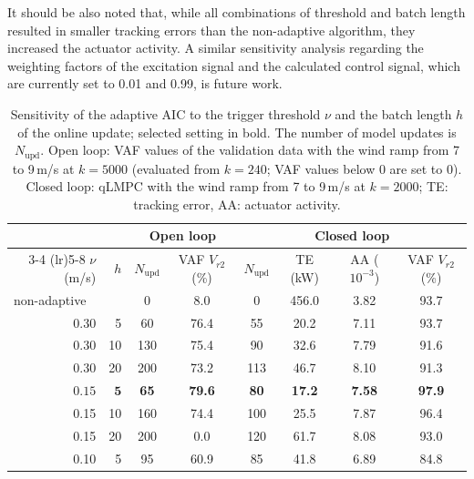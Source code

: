 It should be also noted that, while all combinations of threshold and batch length resulted in smaller tracking errors than the non-adaptive algorithm, they increased the actuator activity. A similar sensitivity analysis regarding the weighting factors of the excitation signal and the calculated control signal, which are currently set to 0.01 and 0.99, is future work.

\begin{table}[htbp]
    \centering
    \caption[Sensitivity of the adaptive AIC to the update settings]{Sensitivity of the adaptive AIC to the trigger threshold $\nu$ and the batch length $h$ of the online update; selected setting in bold. The number of model updates is $N_\text{upd}$. Open loop: VAF values of the validation data with the wind ramp from 7 to 9\,m/s at $k = 5000$ (evaluated from $k = 240$; VAF values below 0 are set to 0). Closed loop: qLMPC with the wind ramp from 7 to 9\,m/s at $k = 2000$; TE: tracking error, AA: actuator activity.}
    \label{tab:sensitivityAdaptiveAIC}
    \begin{tabular}{rr cc cccc}
        \toprule
        & & \multicolumn{2}{c}{Open loop} & \multicolumn{4}{c}{Closed loop} \\
        \cmidrule(lr){3-4} \cmidrule(lr){5-8}
        $\nu$ (m/s) & $h$ & $N_\text{upd}$ & VAF $V_{r2}$ (\%) & $N_\text{upd}$ & TE (kW) & AA ($10^{-3}$) & VAF $V_{r2}$ (\%) \\
        \midrule
        \multicolumn{2}{l}{non-adaptive} & 0 & 8.0 & 0 & 456.0 & 3.82 & 93.7 \\
        \midrule
        0.30 & 5 & 60 & 76.4 & 55 & 20.2 & 7.11 & 93.7 \\
        0.30 & 10 & 130 & 75.4 & 90 & 32.6 & 7.79 & 91.6 \\
        0.30 & 20 & 200 & 73.2 & 113 & 46.7 & 8.10 & 91.3 \\
        \midrule
        $\bm{0.15}$ & $\bm{5}$ & \textbf{65} & \textbf{79.6} & \textbf{80} & \textbf{17.2} & \textbf{7.58} & \textbf{97.9} \\
        0.15 & 10 & 160 & 74.4 & 100 & 25.5 & 7.87 & 96.4 \\
        0.15 & 20 & 200 & 0.0 & 120 & 61.7 & 8.08 & 93.0 \\
        \midrule
        0.10 & 5 & 95 & 60.9 & 85 & 41.8 & 6.89 & 84.8 \\

\end{tabular}
\end{table}
